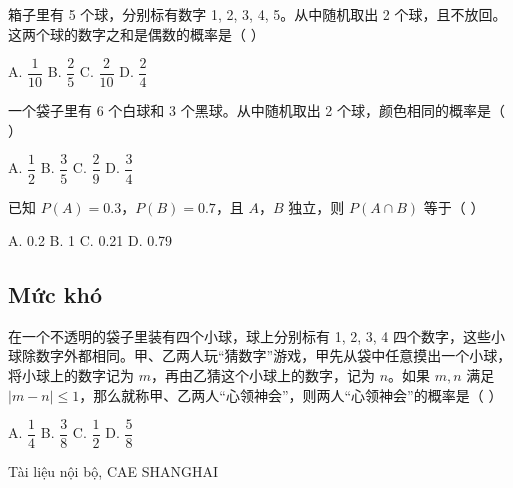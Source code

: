 \documentclass[11pt, a4paper]{article}
\begin{document}
\begin{baitap}[7]
箱子里有 5 个球，分别标有数字 1, 2, 3, 4, 5。从中随机取出 2 个球，且不放回。这两个球的数字之和是偶数的概率是（ ）
\par\vspace{3pt}
\noindent A. $\dfrac{1}{10}$ \quad B. $\dfrac{2}{5}$ \quad C. $\dfrac{2}{10}$ \quad D. $\dfrac{2}{4}$
\end{baitap}
\begin{baitap}[8]
一个袋子里有 6 个白球和 3 个黑球。从中随机取出 2 个球，颜色相同的概率是（ ）
\par\vspace{3pt}
\noindent A. $\dfrac{1}{2}$ \quad B. $\dfrac{3}{5}$ \quad C. $\dfrac{2}{9}$ \quad D. $\dfrac{3}{4}$
\end{baitap}
\begin{baitap}[9]
已知 $P(A)=0.3$，$P(B)=0.7$，且 $A$，$B$ 独立，则 $P(A\cap B)$ 等于（ ）
\par\vspace{3pt}
\noindent A. 0.2 \quad B. 1 \quad C. 0.21 \quad D. 0.79
\end{baitap}
\subsection{Mức khó}

\begin{baitap}[10]
在一个不透明的袋子里装有四个小球，球上分别标有 1, 2, 3, 4 四个数字，这些小球除数字外都相同。甲、乙两人玩“猜数字”游戏，甲先从袋中任意摸出一个小球，将小球上的数字记为 $m$，再由乙猜这个小球上的数字，记为 $n$。如果 $m, n$ 满足 $\lvert m-n \rvert \le 1$，那么就称甲、乙两人“心领神会”，则两人“心领神会”的概率是（ ）
\par\vspace{3pt}
\noindent A. $\dfrac{1}{4}$ \quad B. $\dfrac{3}{8}$ \quad C. $\dfrac{1}{2}$ \quad D. $\dfrac{5}{8}$
\end{baitap}
\vspace{0.8cm}
\begin{center}
{\footnotesize\color{cae_blue} Tài liệu nội bộ, CAE SHANGHAI}
\end{center}
\end{document}

